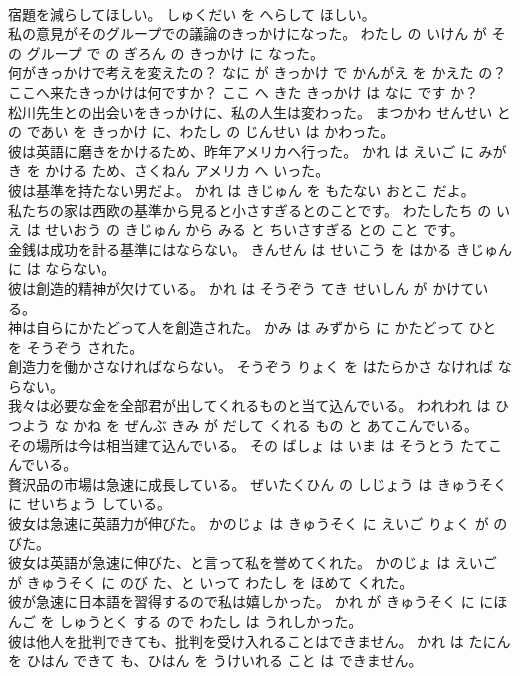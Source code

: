 \documentclass[8pt]{extreport}
\begin{document}
\begin{CJK}{UTF8}{min}
\\	宿題を減らしてほしい。	しゅくだい を へらして ほしい。	
\\	私の意見がそのグループでの議論のきっかけになった。	わたし の いけん が その グループ で の ぎろん の きっかけ に なった。	
\\	何がきっかけで考えを変えたの？	なに が きっかけ で かんがえ を かえた の？	
\\	ここへ来たきっかけは何ですか？	ここ へ きた きっかけ は なに です か？	
\\	松川先生との出会いをきっかけに、私の人生は変わった。	まつかわ せんせい と の であい を きっかけ に、わたし の じんせい は かわった。	
\\	彼は英語に磨きをかけるため、昨年アメリカへ行った。	かれ は えいご に みがき を かける ため、さくねん アメリカ へ いった。	
\\	彼は基準を持たない男だよ。	かれ は きじゅん を もたない おとこ だよ。	
\\	私たちの家は西欧の基準から見ると小さすぎるとのことです。	わたしたち の いえ は せいおう の きじゅん から みる と ちいさすぎる との こと です。	
\\	金銭は成功を計る基準にはならない。	きんせん は せいこう を はかる きじゅん に は ならない。	
\\	彼は創造的精神が欠けている。	かれ は そうぞう てき せいしん が かけている。	
\\	神は自らにかたどって人を創造された。	かみ は みずから に かたどって ひと を そうぞう された。	
\\	創造力を働かさなければならない。	そうぞう りょく を はたらかさ なければ ならない。	
\\	我々は必要な金を全部君が出してくれるものと当て込んでいる。	われわれ は ひつよう な かね を ぜんぶ きみ が だして くれる もの と あてこんでいる。	
\\	その場所は今は相当建て込んでいる。	その ばしょ は いま は そうとう たてこんでいる。	
\\	贅沢品の市場は急速に成長している。	ぜいたくひん の しじょう は きゅうそく に せいちょう している。	
\\	彼女は急速に英語力が伸びた。	かのじょ は きゅうそく に えいご りょく が のびた。	
\\	彼女は英語が急速に伸びた、と言って私を誉めてくれた。	かのじょ は えいご が きゅうそく に のび た、と いって わたし を ほめて くれた。	
\\	彼が急速に日本語を習得するので私は嬉しかった。	かれ が きゅうそく に にほんご を しゅうとく する ので わたし は うれしかった。	
\\	彼は他人を批判できても、批判を受け入れることはできません。	かれ は たにん を ひはん できて も、ひはん を うけいれる こと は できません。	

\end{CJK}
\end{document}
